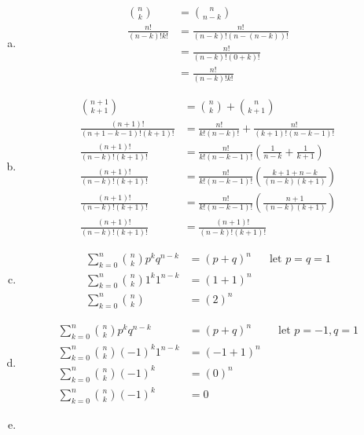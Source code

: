 \documentclass[12pt]{article}
\newenvironment{problem}[2][Problem]{\begin{trivlist}
\item[\hskip \labelsep {\bfseries #1}\hskip \labelsep {\bfseries #2.}]
  \vspace{1 cm}
}{\end{trivlist}}
\begin{document}
\begin{problem}{2.31} 
\item
  \begin{enumerate}[a.]
    \item %
      \begin{align*}
        {{n}\choose{k}} &= {{n}\choose{n-k}} \\
        \frac{n!}{(n-k)!k!} &= \frac{n!}{(n-k)!(n-(n-k))!} \\
        &= \frac{n!}{(n-k)!(0+k)!} \\
        &= \frac{n!}{(n-k)!k!}
      \end{align*} 
    \item %
     \begin{align*}
       \binom{n+1}{k+1} &= \binom{n}{k} + \binom{n}{k+1} \\
       \frac{(n+1)!}{(n+1-k-1)!(k+1)!} &= \frac{n!}{k!(n-k)!} + \frac{n!}{(k+1)!(n-k-1)!} \\
       \frac{(n+1)!}{(n-k)!(k+1)!} &= \frac{n!}{k!(n-k-1)!}\left(\frac{1}{n-k} + \frac{1}{k+1}\right) \\
       \frac{(n+1)!}{(n-k)!(k+1)!} &= \frac{n!}{k!(n-k-1)!}\left(\frac{k+1+n-k}{(n-k)(k+1)}\right) \\
       \frac{(n+1)!}{(n-k)!(k+1)!} &= \frac{n!}{k!(n-k-1)!}\left(\frac{n+1}{(n-k)(k+1)}\right) \\
       \frac{(n+1)!}{(n-k)!(k+1)!} &= \frac{(n+1)!}{(n-k)!(k+1)!} 
      \end{align*}
    \item %
      \begin{align*}
        \sum_{k=0}^n \binom{n}{k} p^k q^{n-k} &= (p+q)^n & & \textrm{let } p = q = 1 \\
        \sum_{k=0}^n \binom{n}{k} 1^k 1^{n-k} &= (1+1)^n \\
        \sum_{k=0}^n \binom{n}{k} &= (2)^n
      \end{align*}
    \item %
      \begin{align*}
        \sum_{k=0}^n \binom{n}{k} p^k q^{n-k} &= (p+q)^n & & \textrm{let } p = -1, q = 1 \\
        \sum_{k=0}^n \binom{n}{k}(-1)^k 1^{n-k} &= (-1+1)^n \\
        \sum_{k=0}^n \binom{n}{k}(-1)^k &= (0)^n \\
        \sum_{k=0}^n \binom{n}{k}(-1)^k &= 0 
      \end{align*}
    \item %
      \begin{align*}

\end{align*}
\end{enumerate}
\end{problem}
\end{document}
